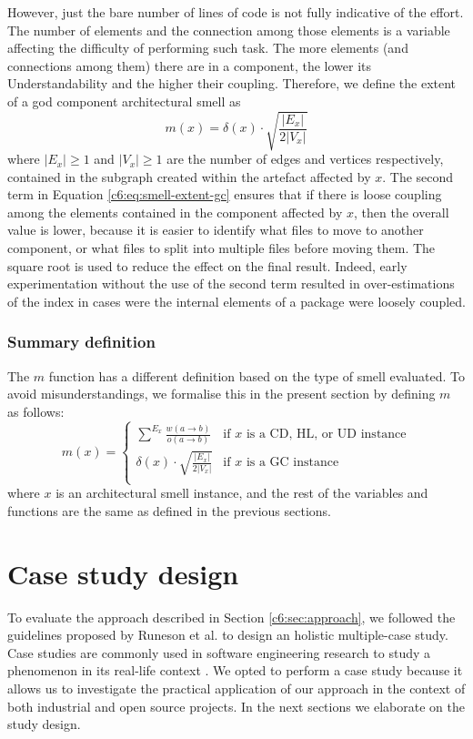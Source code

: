 However, just the bare number of lines of code is not fully indicative of the effort.
The number of elements and the connection among those elements is a variable affecting the difficulty of performing such task. The more elements (and connections among them) there are in a component, the lower its Understandability \cite[p. 32]{Lippert2006} and the higher their coupling.
Therefore, we define the extent of a god component architectural smell as
\begin{equation}\label{c6:eq:smell-extent-gc}
    m(x) = \delta(x) \cdot \sqrt{\frac{|E_x|}{2|V_x|}}
\end{equation}
where $|E_x| \ge 1$ and $|V_x| \ge 1$ are the number of edges and vertices respectively, contained in the subgraph created within the artefact affected by $x$.
The second term in Equation \ref{c6:eq:smell-extent-gc} ensures that if there is loose coupling among the elements contained in the component affected by $x$, then the overall value is lower, because it is easier to identify what files to move to another component, or what files to split into multiple files before moving them. The square root is used to reduce the effect on the final result.
Indeed, early experimentation without the use of the second term resulted in over-estimations of the index in cases were the internal elements of a package were loosely coupled.

\subsubsection{Summary definition}
The $m$ function has a different definition based on the type of smell evaluated. To avoid misunderstandings, we formalise this in the present section by defining $m$ as follows:
\begin{equation}\label{c6:eq:smell-extent-all}
    m(x) = \begin{cases}
        \sum^{E_x} \frac{w(a\rightarrow b)}{o(a \rightarrow b)} & \text{if $x$ is a CD, HL, or UD instance}\\
        \delta(x) \cdot \sqrt{\frac{|E_x|}{2|V_x|}} & \text{if $x$ is a GC instance}\\
    \end{cases} 
\end{equation}
where $x$ is an architectural smell instance, and the rest of the variables and functions are the same as defined in the previous sections.


\section{Case study design}\label{c6:sec:study-design}
To evaluate the approach described in Section \ref{c6:sec:approach}, we followed the guidelines proposed by Runeson et al. \cite{Runeson2012} to design an holistic multiple-case study.
Case studies are commonly used in software engineering research to study a phenomenon in its real-life context \cite{Runeson2012}.
We opted to perform a case study because it allows us to investigate the practical application of our approach in the context of both industrial and open source projects. 
In the next sections we elaborate on the study design.

